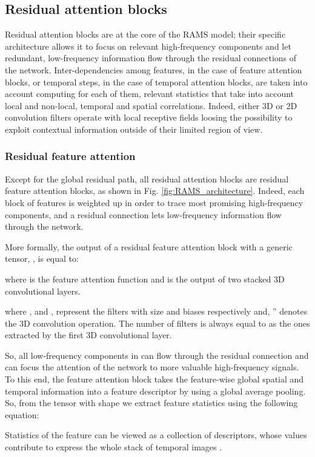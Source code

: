 \documentclass[journal]{IEEEtran}
\begin{document}
\subsection{Residual attention blocks}
Residual attention blocks are at the core of the RAMS model; their specific architecture allows it to focus on relevant high-frequency components and let redundant, low-frequency information flow through the residual connections of the network.
Inter-dependencies among features, in the case of feature attention blocks, or temporal steps, in the case of temporal attention blocks, are taken into account computing for each of them, relevant statistics that take into account local and non-local, temporal and spatial correlations. Indeed, either 3D or 2D convolution filters operate with local receptive fields loosing the possibility to exploit contextual information outside of their limited region of view.
\subsubsection{Residual feature attention}
Except for the global residual path, all residual attention blocks are residual feature attention blocks, as shown in Fig. \ref{fig:RAMS_architecture}. Indeed, each block of features is weighted up in order to trace most promising high-frequency components, and a residual connection lets low-frequency information flow through the network.

More formally, the output of a residual feature attention block with a generic tensor, , is equal to:

where  is the feature attention function and  is the output of two stacked 3D convolutional layers.

where , and ,  represent the filters with size  and biases respectively and, '' denotes the 3D convolution operation.
The number of filters is always equal to  as the ones extracted by the first 3D convolutional layer. 

So, all low-frequency components in  can flow through the residual connection and  can focus the attention of the network to more valuable high-frequency signals. 
To this end, the feature attention block takes the feature-wise global spatial and temporal information into a feature descriptor by using a global average pooling. So, from the tensor  with shape  we extract  feature statistics using the following equation:

Statistics of the feature  can be viewed as a collection of descriptors, whose values contribute to express the whole stack of temporal images \cite{hu2018squeeze}.
\end{document}
